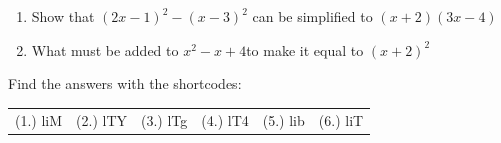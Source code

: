\begin{enumerate}[noitemsep, label=\textbf{\arabic*}. ]
\label{m39392*uid56}\item Show that ${\left(2x-1\right)}^{2}-{\left(x-3\right)}^{2}$ can be simplified to $\left(x+2\right)\left(3x-4\right)$
\newline
\newline
\label{m39392*uid57}\item What must be added to ${x}^{2}-x+4$\hspace{1ex}to make it equal to ${\left(x+2\right)}^{2}$
\newline
\newline
\end{enumerate}
  \label{m39392**end}
  \label{d4e6ddcad4e2d9e383c4732da6858c66**end}
\par {} Find the answers with the shortcodes:
 \par \begin{tabular}[h]{cccccc}
 (1.) liM  &  (2.) lTY  &  (3.) lTg  &  (4.) lT4  &  (5.) lib  &  (6.) liT  & \end{tabular}
